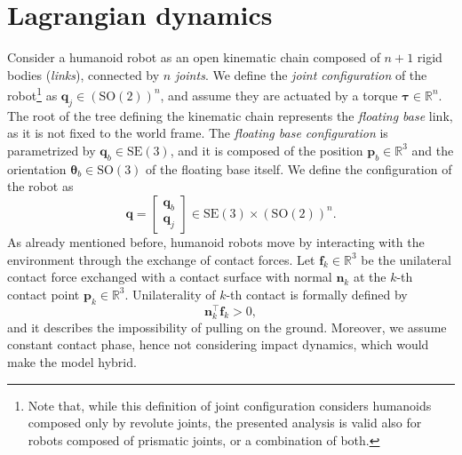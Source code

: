 \section{Lagrangian dynamics}
\label{sec:lagrangian-dynamics}
Consider a humanoid robot as an open kinematic chain composed of $n+1$ rigid bodies
(\textit{links}), connected by $n$ \textit{joints}. We define the \textit{joint
configuration} of the robot\footnote{Note that, while this definition of
joint configuration considers
humanoids composed only by revolute joints, the presented analysis is valid also for
robots composed of prismatic joints, or a combination of both.} as $\bm{q}_j \in \left(\mathrm{SO}(2)\right)^n$, and assume they
are actuated by a torque $\bm{\tau} \in \mathbb{R}^n$. The root of the tree defining the
kinematic chain represents the \textit{floating base} link, as it is not fixed to the
world frame. The \textit{floating base configuration} is parametrized by
$\bm{q}_b \in \mathrm{SE}(3)$, and it is composed of the position
$\bm{p}_b \in \mathbb{R}^3$ and the orientation $\bm{\theta}_b \in \mathrm{SO}(3)$
of the floating base itself. We define the configuration of the robot as
\begin{equation*}
    \bm{q} =
    \begin{bmatrix}
        \bm{q}_b \\ \bm{q}_j
    \end{bmatrix} \in \mathrm{SE}(3) \times \left(\mathrm{SO}(2)\right)^{n}.
\end{equation*}
As already mentioned before, humanoid robots move by interacting with the 
environment through the exchange of contact forces. Let $\bm{f}_k \in \mathbb{R}^3$
be the unilateral contact force exchanged with a contact surface
with normal $\bm{n}_k$ at the $k$-th 
contact point $\bm{p}_k\in\mathbb{R}^3$. Unilaterality of $k$-th contact is formally
defined by
\begin{equation*}
    \bm{n}_k^\top \bm{f}_k > 0,
\end{equation*}
and it describes the impossibility of pulling on the ground. Moreover, we
assume constant contact phase, hence not considering impact dynamics, which
would make the model hybrid.

